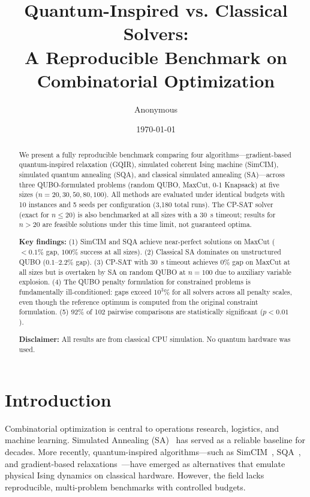 \documentclass[10pt,twocolumn]{article}
\title{Quantum-Inspired vs. Classical Solvers:\\A Reproducible Benchmark on Combinatorial Optimization}
\author{Anonymous}
\date{\today}
\begin{document}
\maketitle

\begin{abstract}
We present a fully reproducible benchmark comparing four algorithms---gradient-based quantum-inspired relaxation (GQIR), simulated coherent Ising machine (SimCIM), simulated quantum annealing (SQA), and classical simulated annealing (SA)---across three QUBO-formulated problems (random QUBO, MaxCut, 0-1 Knapsack) at five sizes ($n=20,30,50,80,100$). All methods are evaluated under identical budgets with 10 instances and 5 seeds per configuration (3,180 total runs). The CP-SAT solver (exact for $n\leq20$) is also benchmarked at all sizes with a 30~s timeout; results for $n>20$ are feasible solutions under this time limit, not guaranteed optima.

\textbf{Key findings:} (1) SimCIM and SQA achieve near-perfect solutions on MaxCut ($<0.1\%$ gap, $100\%$ success at all sizes). (2) Classical SA dominates on unstructured QUBO ($0.1$--$2.2\%$ gap). (3) CP-SAT with 30~s timeout achieves $0\%$ gap on MaxCut at all sizes but is overtaken by SA on random QUBO at $n=100$ due to auxiliary variable explosion. (4) The QUBO penalty formulation for constrained problems is fundamentally ill-conditioned: gaps exceed $10^3\%$ for all solvers across all penalty scales, even though the reference optimum is computed from the original constraint formulation. (5) $92\%$ of 102 pairwise comparisons are statistically significant ($p<0.01$).

\textbf{Disclaimer:} All results are from classical CPU simulation. No quantum hardware was used.
\end{abstract}

\section{Introduction}
\label{sec:intro}

Combinatorial optimization is central to operations research, logistics, and machine learning. Simulated Annealing (SA)~\cite{kirkpatrick1983} has served as a reliable baseline for decades. More recently, quantum-inspired algorithms---such as SimCIM~\cite{leleu2021}, SQA~\cite{openjij}, and gradient-based relaxations~\cite{peterson1991}---have emerged as alternatives that emulate physical Ising dynamics on classical hardware. However, the field lacks reproducible, multi-problem benchmarks with controlled budgets.
\end{document}
